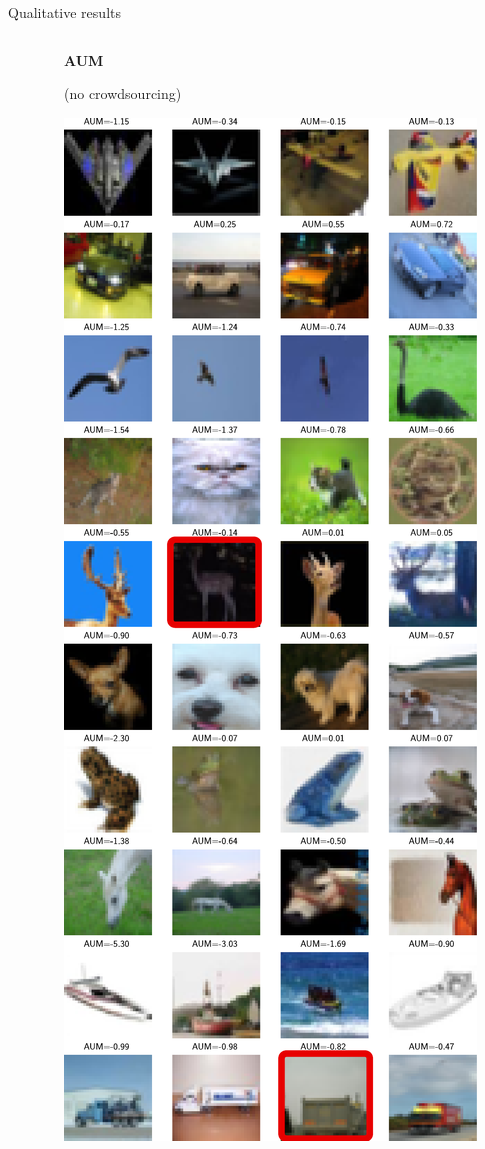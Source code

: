 \begin{frame}{Qualitative results}{}
\begin{columns}
\begin{column}{.3\textwidth}
        \end{column}
        \begin{column}{.3\textwidth}
            \textbf{AUM}

            (no crowdsourcing)

            \vspace{.25cm}

            \centering
            \includegraphics[width=\textwidth, clip, trim={0cm 0cm 0cm 12cm}]{../chapters/images/lowest_aum_cut.pdf}
        \end{column}


\end{columns}
\end{frame}
